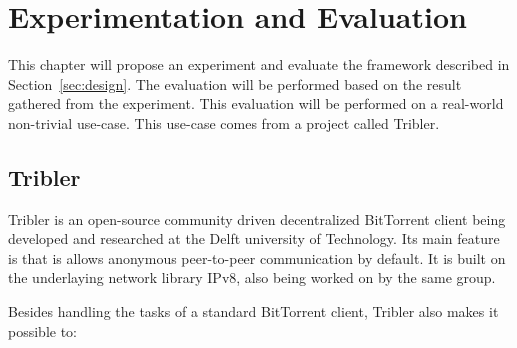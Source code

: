 \chapter{\label{sec:experimentation-and-evaluation}Experimentation and Evaluation}


This chapter will propose an experiment and evaluate the framework described in Section~\ref{sec:design}. The evaluation will be performed based on the result gathered from the experiment. This evaluation will be performed on a real-world non-trivial use-case. This use-case comes from a project called Tribler.

\section{Tribler}

Tribler is an open-source community driven decentralized BitTorrent client being developed and researched at the Delft university of Technology. Its main feature is that is allows anonymous peer-to-peer communication by default. It is built on the underlaying network library IPv8, also being worked on by the same group.

Besides handling the tasks of a standard BitTorrent client, Tribler also makes it possible to:

